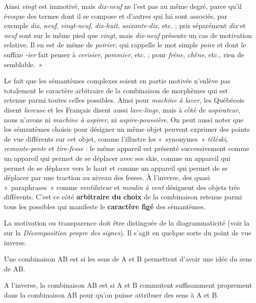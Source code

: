 Ainsi \textit{vingt} est immotivé, mais \textit{dix-neuf} ne l’est pas au même degré, parce qu’il évoque des termes dont il se compose et d’autres qui lui sont associés, par exemple \textit{dix}, \textit{neuf}, \textit{vingt-neuf}, \textit{dix-huit}, \textit{soixante-dix}, etc. ; pris séparément \textit{dix} et \textit{neuf} sont sur le même pied que \textit{vingt}, mais \textit{dix-neuf} présente un cas de motivation relative. Il en est de même de \textit{poirier}, qui rappelle le mot simple \textit{poire} et dont le suffixe \textit{{}-ier} fait penser à \textit{cerisier}, \textit{pommier}, etc. ; pour \textit{frêne}, \textit{chêne}, etc., rien de semblable.~»

Le fait que les sémantèmes complexes soient en partie motivés n’enlève pas totalement le caractère arbitraire de la combinaison de morphèmes qui est retenue parmi toutes celles possibles. Ainsi pour \textit{machine à laver}, les Québécois disent \textit{laveuse} et les Français disent aussi \textit{lave-linge}, mais à côté de \textit{aspirateur}, nous n’avons ni \textit{machine à aspirer}, ni \textit{aspire-poussière}. On peut aussi noter que les sémantèmes choisis pour désigner un même objet peuvent exprimer des points de vue différents sur cet objet, comme l’illustre les «~synonymes~» \textit{téléski}, \textit{remonte-pente} et \textit{tire-fesse} : le même appareil est présenté successivement comme un appareil qui permet de se déplacer avec ses skis, comme un appareil qui permet de se déplacer vers le haut et comme un appareil qui permet de se déplacer par une traction au niveau des fesses. À l’inverse, des quasi «~paraphrases~» comme \textit{ventilateur} et \textit{moulin à vent} désignent des objets très différents. C’est ce côté \textbf{arbitraire du choix} de la combinaison retenue parmi tous les possibles qui manifeste le \textbf{caractère figé} des sémantèmes.

La motivation ou transparence doit être distinguée de la diagrammaticité (voir la  sur la \textit{Décomposition propre des signes}). Il s’agit en quelque sorte du point de vue inverse.

\begin{styleLivreImportant}
Une combinaison AB est  si les sens de A et B permettent d’avoir une idée du sens de AB.
\end{styleLivreImportant}

\begin{styleLivreImportant}
A l’inverse, la combinaison AB est  si A et B commutent suffisamment proprement dans la combinaison AB pour qu’on puisse attribuer des sens à A et B.
\end{styleLivreImportant}

